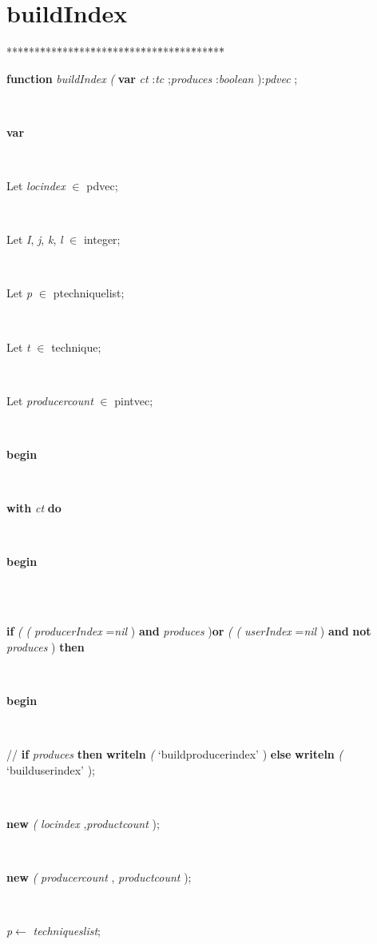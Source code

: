 \section{buildIndex}\label{sec:technologies/hash/defineproductlistbuildIndex}

\begin{tabbing}
***\=***\=***\=***\=***\=***\=***\=***\=***\=***\=***\=***\=***\=\kill
\parbox{14cm}{\textsf{\textbf{function}   \textit{buildIndex} \textit{(} \textbf{var}  \textit{ct} :\textit{tc} ;\textit{produces} :\textit{boolean} ):\textit{pdvec}  ;}}\\
\+\parbox{14cm}{\textsf{\textbf{var} }}\\
\parbox{14cm}{\textsf{Let \textit{locindex} $\in$ pdvec;}}\\
\parbox{14cm}{\textsf{Let \textit{I}, \textit{j}, \textit{k}, \textit{l} $\in$ integer;}}\\
\parbox{14cm}{\textsf{Let \textit{p} $\in$ ptechniquelist;}}\\
\parbox{14cm}{\textsf{Let \textit{t} $\in$ technique;}}\\
\parbox{14cm}{\textsf{Let \textit{producercount} $\in$ pintvec;}}\\
\-\<\+\parbox{14cm}{\textsf{\textbf{begin} }}\\
\+\parbox{14cm}{\textsf {\textbf {with } \textsf{ \textit{ct}  } \textbf{ do } }}\\
\<\parbox{14cm}{\textsf{\textbf{begin} }}\\
\\
\+\parbox{14cm}{\textsf {\textbf {if } \textsf{\textit{(} \textit{(} \textit{producerIndex} =\textit{nil} )} \textbf{ and } \textsf{ \textit{produces} )\textbf{or}  \textit{(} \textit{(} \textit{userIndex} =\textit{nil} )} \textbf{ and } \textsf{ \textbf{not}  \textit{produces} )} \textbf{ then } }}\\
\<\parbox{14cm}{\textsf{\textbf{begin} }}\\
\parbox{14cm}{\textsf{// \textbf{if}  \textit{produces}  \textbf{then}  \textbf{writeln} \textit{(} \textrm{\textup { `buildproducerindex' } }) \textbf{else}  \textbf{writeln}  \textit{(} \textrm{\textup { `builduserindex' } });}}\\
\parbox{14cm}{\textsf{\textbf{new} \textit{(}  \textit{locindex} ,\textit{productcount}  );}}\\
\parbox{14cm}{\textsf{\textbf{new} \textit{(} \textit{producercount} , \textit{productcount} );}}\\
\parbox{14cm}{\textsf{\textit{p}$\leftarrow$ \textit{techniqueslist}}; }\\

\end{tabbing}
